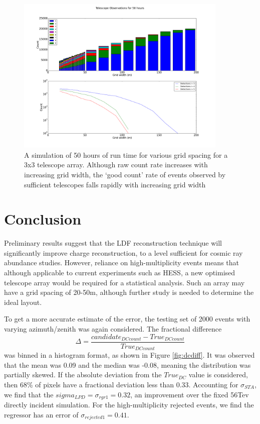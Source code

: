 \documentclass[11pt]{article}
\begin{document}
\begin{figure}
\begin{center}
\includegraphics[width=0.9\textwidth]{optimiselayout}
\caption{A simulation of 50 hours of run time for various grid spacing for a 3x3 telescope array. Although raw count rate increases with increasing grid width, the \textquoteleft good count' rate of events observed by sufficient telescopes falls rapidly with increasing grid width}
\label{fig:optmiselayout}
\end{center}
\end{figure}

\section{Conclusion}
Preliminary results suggest that the LDF reconstruction technique will significantly improve charge reconstruction, to a level sufficient for cosmic ray abundance studies. However, reliance on high-multiplicity events means that although applicable to current experiments such as HESS, a new optimised telescope array would be required for a statistical analysis. Such an array may have a grid spacing of 20-50m, although further study is needed to determine the ideal layout.

To get a more accurate estimate of the error, the testing set of 2000 events with varying azimuth/zenith was again considered. The fractional difference \[  \Delta = \frac{ candidate_{DC count} - True_{DC count}}{True_{DC count}} \] was binned in a histogram format, as shown in Figure \ref{fig:dcdiff}. It was observed that the mean was 0.09 and the median was -0.08, meaning the distribution was partially skewed. If the absolute deviation from the $True_{DC}$ value is considered, then 68\% of pixels have a fractional deviation less than 0.33. Accounting for $\sigma_{STA}$, we find that the $sigma_{LPD}=\sigma_{rgr1}=0.32$, an improvement over the fixed 56Tev directly incident simulation. For the high-multiplicity rejected events, we find the regressor has an error of $\sigma_{rejected1}=0.41$.
\end{document}
